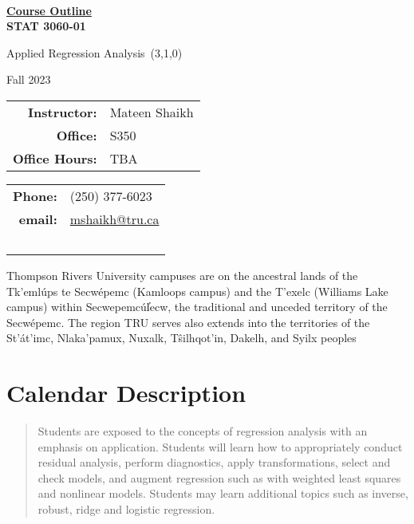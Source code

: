 \documentclass[10pt]{trumathoutline}
\makeatletter
\newcommand{\instructorname}     {Mateen Shaikh}
\newcommand{\instructorphone}    {(250) 377-6023}
\newcommand{\instructoremail}    {mshaikh@tru.ca}
\newcommand{\instructorofficehrs}{TBA}
\newcommand{\instructorofficerm} {S350}
\newcommand{\coursecode}     	 {STAT 3060-01}
\newcommand{\coursetitle}    	 {Applied Regression Analysis}
\newcommand{\coursevectoring}	 {(3,1,0)}
\newcommand{\term}           	 {Fall 2023}
\newcommand{\calendardescription}{
	Students are exposed to the concepts of regression analysis with an emphasis on application. Students will learn how to appropriately conduct residual analysis, perform diagnostics, apply transformations, select and check models, and augment regression such as with weighted least squares and nonlinear models. Students may learn additional topics such as inverse, robust, ridge and logistic regression.
}
\newcommand{\coursedescription}{
}
\makeatother
\begin{document}
	
	~
	
	\vspace{-1em}
	
	\begin{center}
		\bfseries
		{\Large \underline{Course Outline}}\\[0.5em]
		
		\coursecode
		
		\coursetitle\ \coursevectoring
		
		\term
		
	\end{center}
\begin{tabular}{ r l}
	\textbf{Instructor:}	& \instructorname 	\\
	\textbf{Office:} 		& \instructorofficerm \\
	\textbf{Office Hours:} 	& \instructorofficehrs
\end{tabular}\hfill
\begin{tabular}{ r l}
	 \textbf{Phone:} & \instructorphone\\
	 \textbf{email:} & \href{mailto:\instructoremail}{\instructoremail}\\
	~
\end{tabular}

\vspace{1em}



Thompson Rivers University campuses are on the ancestral lands of the Tk'emlúps te Secwépemc (Kamloops campus) and the T’exelc (Williams Lake campus) within Secwepemcúl̓ecw, the traditional and unceded territory of the Secwépemc. The region TRU serves also extends into the territories of the St’át’imc, Nlaka’pamux, Nuxalk, Tŝilhqot'in, Dakelh, and Syilx peoples

\section*{Calendar Description}
\begin{quote}
	\calendardescription
\end{quote}
	
\end{document}
